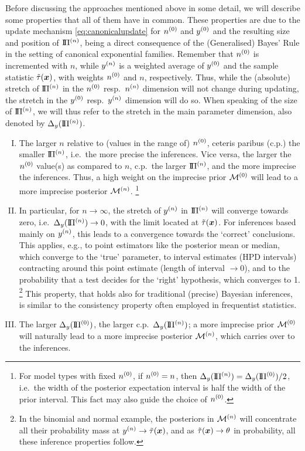 Before discussing the approaches mentioned above in some detail,
we will describe some properties that all of them have in common.
These properties are due to the update mechanism \eqref{eq:canonicalupdate}
for $n^{(0)}$ and $y^{(0)}$ and the resulting size and position of $\text{I}\!\Pi^{(n)}$,
being a direct consequence of the (Generalised) Bayes' Rule in the setting of canonical exponential families.
Remember that $n^{(0)}$ is incremented with $n$, while $y^{(n)}$ is a weighted average of $y^{(0)}$ and the sample statistic $\tilde{\tau}({\bm x})$,
with weights $n^{(0)}$ and $n$, respectively.
Thus, while the (absolute) stretch of $\text{I}\!\Pi^{(n)}$ in the $n^{(0)}$ resp.\ $n^{(n)}$ dimension will not change during updating,
the stretch in the $y^{(0)}$ resp.\ $y^{(n)}$ dimension will do so.
When speaking of the size of $\text{I}\!\Pi^{(n)}$, we will thus refer to the stretch in the main parameter dimension, also denoted by $\Delta_y(\text{I}\!\Pi^{(n)})$.
\begin{enumerate}[I.]
\item \label{enum:n0vsn}The larger $n$ relative to (values in the range of) $n^{(0)}$,
ceteris paribus (c.p.) the smaller $\text{I}\!\Pi^{(n)}$, i.e.\ the more precise the inferences.
Vice versa, the larger the $n^{(0)}$ value(s) as compared to $n$, c.p.\ the larger $\text{I}\!\Pi^{(n)}$, and the more imprecise the inferences.
Thus, a high weight on the imprecise prior $\mathcal{M}^{(0)}$ will lead to a more imprecise posterior $\mathcal{M}^{(n)}$.%
\footnote{For model types with fixed $n^{(0)}$, if $n^{(0)} = n$, then $\Delta_y(\text{I}\!\Pi^{(n)}) = \Delta_y(\text{I}\!\Pi^{(0)}) / 2$,
i.e.\ the width of the posterior expectation interval is half the width of the prior interval.
This fact may also guide the choice of $n^{(0)}$.}
\item \label{enum:ntoinfty}In particular, for $n \to \infty$, the stretch of $y^{(n)}$ in $\text{I}\!\Pi^{(n)}$ will converge towards zero,
i.e.\ $\Delta_y(\text{I}\!\Pi^{(n)}) \to 0$, with the limit located at $\tilde{\tau}({\bm x})$.
For inferences based mainly on $y^{(n)}$, this leads to a convergence towards the `correct' conclusions.
This applies, e.g., to point estimators like the posterior mean or median, which converge to the `true' parameter,
to interval estimates (HPD intervals) contracting around this point estimate (length of interval $\to 0$),
and to the probability that a test decides for the `right' hypothesis, which converges to 1.%
\footnote{In the binomial and normal example,
the posteriors in $\mathcal{M}^{(n)}$ will concentrate all their probability mass at $y^{(n)} \to \tilde{\tau}({\bm x})$,
and as $\tilde{\tau}({\bm x}) \to \theta$ in probability, all these inference properties follow.}
This property, that holds also for traditional (precise) Bayesian inferences,
is similar to the consistency property often employed in frequentist statistics.
\item \label{enum:deltay}The larger $\Delta_y(\text{I}\!\Pi^{(0)})$, the larger c.p.\ $\Delta_y(\text{I}\!\Pi^{(n)})$;
a more imprecise prior $\mathcal{M}^{(0)}$ will naturally lead to a more imprecise posterior $\mathcal{M}^{(n)}$, which carries over to the inferences.
\end{enumerate}

